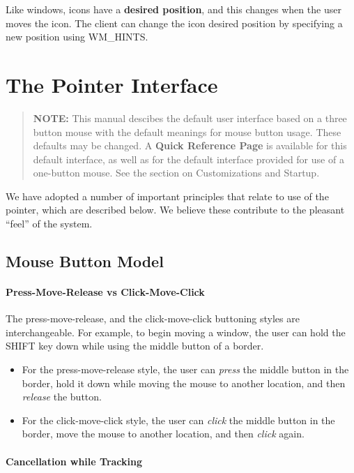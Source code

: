 Like windows, icons have a {\bf desired position}, and this changes when
the user moves the icon.  The client can change the icon desired position
by specifying a new position using {\sc WM\_HINTS}.

\section{The Pointer Interface}

\begin{quotation}
{\bf NOTE:}
This manual descibes the default user interface based on a three button
mouse with the default meanings for mouse button usage.  These defaults
may be changed.
A {\bf Quick Reference Page} is available for this default interface, as
well as for the default interface provided for use of a one-button mouse.
See the section on Customizations and Startup.
\end{quotation}

We have adopted a number of important principles that relate to use of the
pointer, which are described below.
We believe these contribute to the pleasant ``feel'' of the system.

\subsection{Mouse Button Model}

\paragraph{Press-Move-Release vs Click-Move-Click}

The press-move-release, and the click-move-click buttoning styles are
interchangeable.
For example, to begin moving a window, the user can hold the SHIFT key
down while using the middle button of a border.
\begin{itemize}
\item For the press-move-release style, the user can
{\it press} the middle button in the border, hold it down while
moving the mouse to another location, and then {\it release} the button.

\item For the click-move-click style,
the user can {\it click} the middle button in the border,
move the mouse to another location, and then
{\it click} again.
\end{itemize}

\paragraph{Cancellation while Tracking}

